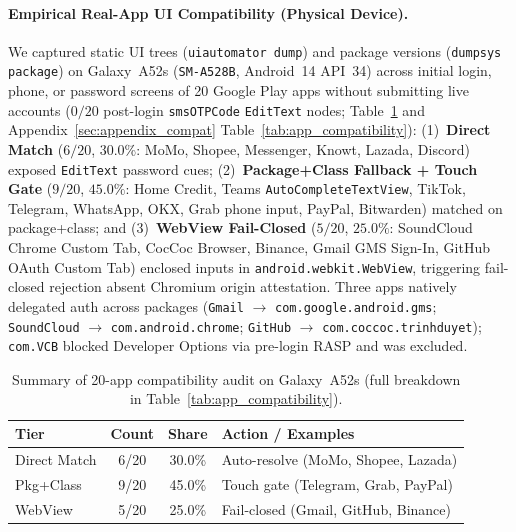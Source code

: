 \documentclass[sigconf,10pt]{acmart}
\theoremstyle{acmplain}%
\begin{document}
\paragraph{Empirical Real-App UI Compatibility (Physical Device).}
We captured static UI trees (\texttt{uiautomator dump}) and package versions (\texttt{dumpsys package}) on Galaxy~A52s (\texttt{SM-A528B}, Android~14 API~34) across initial login, phone, or password screens of 20 Google Play apps without submitting live accounts ($0/20$ post-login \texttt{smsOTPCode} \texttt{EditText} nodes; Table~\ref{tab:compat_summary} and Appendix~\ref{sec:appendix_compat} Table~\ref{tab:app_compatibility}): (1)~\textbf{Direct Match} ($6/20$, $30.0\%$: MoMo, Shopee, Messenger, Knowt, Lazada, Discord) exposed \texttt{EditText} password cues; (2)~\textbf{Package+Class Fallback + Touch Gate} ($9/20$, $45.0\%$: Home Credit, Teams \texttt{AutoCompleteTextView}, TikTok, Telegram, WhatsApp, OKX, Grab phone input, PayPal, Bitwarden) matched on package+class; and (3)~\textbf{WebView Fail-Closed} ($5/20$, $25.0\%$: SoundCloud Chrome Custom Tab, CocCoc Browser, Binance, Gmail GMS Sign-In, GitHub OAuth Custom Tab) enclosed inputs in \texttt{android.webkit.WebView}, triggering fail-closed rejection absent Chromium origin attestation. Three apps natively delegated auth across packages (\texttt{Gmail} $\rightarrow$ \texttt{com.google.android.gms}; \texttt{SoundCloud} $\rightarrow$ \texttt{com.android.chrome}; \texttt{GitHub} $\rightarrow$ \texttt{com.coccoc.trinhduyet}); \texttt{com.VCB} blocked Developer Options via pre-login RASP and was excluded.

\begin{table}[h]
\centering\scriptsize
\caption{Summary of 20-app compatibility audit on Galaxy~A52s (full breakdown in Table~\ref{tab:app_compatibility}).}
\label{tab:compat_summary}
\setlength{\tabcolsep}{2.5pt}
\begin{tabular*}{\columnwidth}{@{\extracolsep{\fill}}lccl@{}}
\toprule
Tier & Count & Share & Action / Examples \\
\midrule
Direct Match & 6/20 & 30.0\% & Auto-resolve (MoMo, Shopee, Lazada) \\
Pkg+Class & 9/20 & 45.0\% & Touch gate (Telegram, Grab, PayPal) \\
WebView & 5/20 & 25.0\% & Fail-closed (Gmail, GitHub, Binance) \\
\bottomrule
\end{tabular*}
\end{table}
\end{document}
